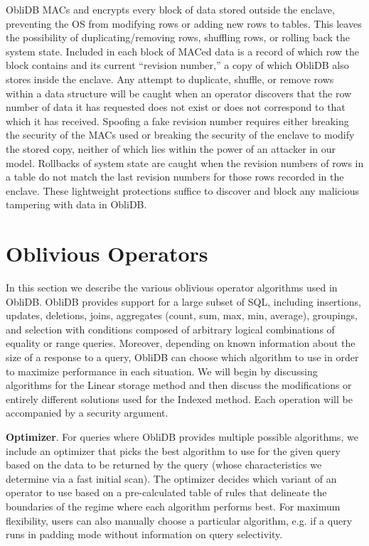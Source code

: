 \documentclass[letterpaper,twocolumn,10pt]{article}
\def\name/{ObliDB}
\begin{document}
\name/ MACs and encrypts every block of data stored outside the enclave, preventing the OS from modifying rows or adding new rows to tables. This leaves the possibility of duplicating/removing rows, shuffling rows, or rolling back the system state. Included in each block of MACed data is a record of which row the block contains and its current ``revision number,'' a copy of which \name/ also stores inside the enclave. Any attempt to duplicate, shuffle, or remove rows within a data structure will be caught when an operator discovers that the row number of data it has requested does not exist or does not correspond to that which it has received. Spoofing a fake revision number requires either breaking the security of the MACs used or breaking the security of the enclave to modify the stored copy, neither of which lies within the power of an attacker in our model. Rollbacks of system state are caught when the revision numbers of rows in a table do not match the last revision numbers for those rows recorded in the enclave. These lightweight protections suffice to discover and block any malicious tampering with data in \name/.

\section{Oblivious Operators}\label{oblivOps}
In this section we describe the various oblivious operator algorithms used in \name/. \name/ provides support for a large subset of SQL, including insertions, updates, deletions, joins, aggregates (count, sum, max, min, average), groupings, and selection with conditions composed of arbitrary logical combinations of equality or range queries. Moreover, depending on known information about the size of a response to a query, \name/ can choose which algorithm to use in order to maximize performance in each situation. We will begin by discussing algorithms for the Linear storage method and then discuss the modifications or entirely different solutions used for the Indexed method. Each operation will be accompanied by a security argument.

\noindent \textbf{Optimizer}. For queries where \name/ provides multiple possible algorithms, we include an optimizer that picks the best algorithm to use for the given query based on the data to be returned by the query (whose characteristics we determine via a fast initial scan). The optimizer decides which variant of an operator to use based on a pre-calculated table of rules that delineate the boundaries of the regime where each algorithm performs best. For maximum flexibility, users can also manually choose a particular algorithm, e.g. if a query runs in padding mode without information on query selectivity.
\end{document}
